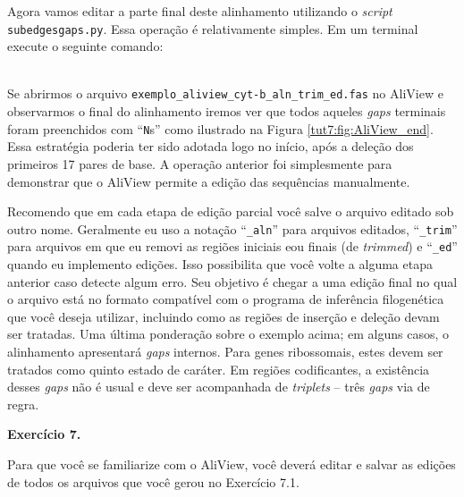 \begin{refsection}

Agora vamos editar a parte final deste alinhamento utilizando o \textit{script} \texttt{subedgesgaps.py}. Essa operação é relativamente simples. Em um terminal execute o seguinte comando:

\\


Se abrirmos o arquivo \texttt{exemplo\_aliview\_cyt-b\_aln\_trim\_ed.fas} no AliView e observarmos o final do alinhamento iremos ver que todos aqueles \textit{gaps} terminais foram preenchidos com ``\texttt{N}s'' como ilustrado na Figura \ref{tut7:fig:AliView_end}. Essa estratégia poderia ter sido adotada logo no início,  após a deleção dos primeiros 17 pares de base. A operação anterior foi simplesmente para demonstrar que o AliView permite a edição das sequências manualmente.


Recomendo que em cada etapa de edição parcial você salve o arquivo editado sob outro nome. Geralmente eu uso a notação ``\texttt{\_aln}'' para arquivos editados, ``\texttt{\_trim}'' para arquivos em que eu removi as regiões iniciais e\/ou finais (de \textit{trimmed}) e ``\texttt{\_ed}'' quando eu implemento edições. Isso possibilita que você volte a alguma etapa anterior caso detecte algum erro. Seu objetivo é chegar a uma edição final no qual o arquivo está no formato compatível com o programa de inferência filogenética que você deseja utilizar, incluindo como as regiões de inserção e deleção devam ser tratadas. Uma última ponderação sobre o exemplo acima; em alguns casos, o alinhamento apresentará \textit{gaps} internos. Para genes ribossomais, estes devem ser tratados como quinto estado de caráter. Em regiões codificantes, a existência desses \textit{gaps} não é usual e deve ser acompanhada de \textit{triplets} -- três \textit{gaps} via de regra.

\vspace{0.5cm}

\begin{blackBlock}{\textbf{Exercício 7.}}\label{tut7:ex:ex3}

Para que você se familiarize com o AliView, você deverá editar e salvar as edições de todos os arquivos que você gerou no Exercício 7.1.

\end{blackBlock}



\end{refsection}
